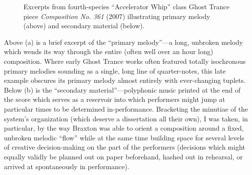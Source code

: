         \begin{figure}
            \centering
            
            \vspace{5pt}
            
            \captionsetup{width=.5\textwidth}
            \caption[Excerpts from fourth-species ``Accelerator Whip'' class Ghost Trance piece \textit{Composition No. 361} (2007) illustrating primary melody (above) and secondary material (below).]{Excerpts from fourth-species ``Accelerator Whip'' class Ghost Trance piece \textit{Composition No. 361} (2007) illustrating primary melody (above) and secondary material (below).\footnotemark}%
            \label{fig:ghosttranceex}%
        \end{figure}

    Above (a) is a brief excerpt of the ``primary melody''---a long, unbroken melody which wends its way through the entire (often well over an hour long) composition. Where early Ghost Trance works often featured totally isochronous primary melodies sounding as a single, long line of quarter-notes, this late example obscures its primary melody almost entirely with ever-changing tuplets. Below (b) is the ``secondary material''---polyphonic music printed at the end of the score which serves as a reservoir into which performers might jump at particular times to be determined in-performance. Bracketing the minutiae of the system's organization (which deserve a dissertation all their own), I was taken, in particular, by the way Braxton was able to orient a composition around a fixed, unbroken melodic ``flow'' while at the same time building space for several levels of creative decision-making on the part of the performers (decisions which might equally validly be planned out on paper beforehand, hashed out in rehearsal, or arrived at spontaneously in performance).


